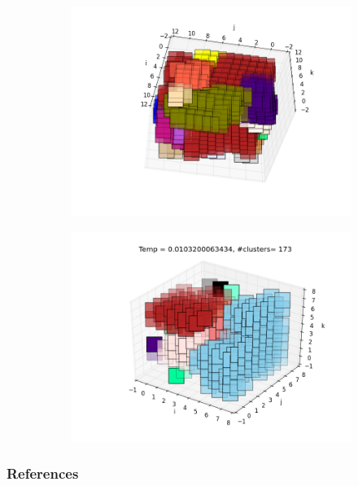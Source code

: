 \documentclass{beamer}
\begin{document}
\begin{frame}
\begin{figure}
\begin{subfigure}{0.45\textwidth}
  \centering
  \includegraphics[width=.9\linewidth]{fig/figure_1.png}
  \caption{}%
  \label{fig:fig_good_final_cluster_12}
\end{subfigure}
\hspace*{\fill}
\begin{subfigure}{0.45\textwidth}
  \centering

  \includegraphics[width=.9\linewidth]{fig/cluster-8x8x8-2.png}
  \caption{}%
  \label{fig:fig_good_final_cluster_7}
\end{subfigure}

\end{figure}
\end{frame}


\begin{frame}
    \frametitle{References}
    
    \printbibliography
\end{frame}
\end{document}
